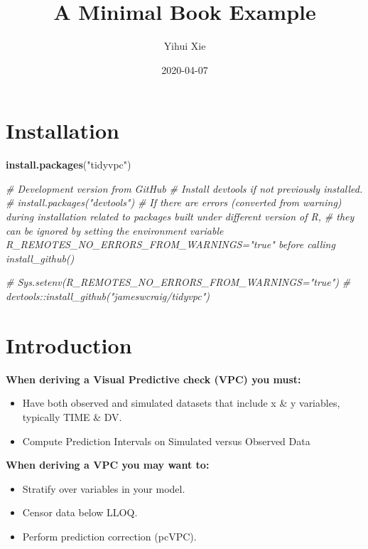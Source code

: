 \documentclass[
]{book}
\title{A Minimal Book Example}
\author{Yihui Xie}
\date{2020-04-07}
\newenvironment{Shaded}{\begin{snugshade}}{\end{snugshade}}
\newcommand{\CommentTok}[1]{\textcolor[rgb]{0.56,0.35,0.01}{\textit{#1}}}
\newcommand{\KeywordTok}[1]{\textcolor[rgb]{0.13,0.29,0.53}{\textbf{#1}}}
\newcommand{\NormalTok}[1]{#1}
\newcommand{\StringTok}[1]{\textcolor[rgb]{0.31,0.60,0.02}{#1}}
\begin{document}
\maketitle

{
\setcounter{tocdepth}{1}
\tableofcontents
}
\hypertarget{installation}{%
\chapter{Installation}\label{installation}}

\begin{Shaded}
\begin{Highlighting}[]
\KeywordTok{install.packages}\NormalTok{(}\StringTok{"tidyvpc"}\NormalTok{)}

\CommentTok{# Development version from GitHub}
\CommentTok{# Install devtools if not previously installed.}
\CommentTok{# install.packages("devtools")}
\CommentTok{# If there are errors (converted from warning) during installation related to packages built under different version of R,}
\CommentTok{# they can be ignored by setting the environment variable R_REMOTES_NO_ERRORS_FROM_WARNINGS="true" before calling install_github()}

\CommentTok{# Sys.setenv(R_REMOTES_NO_ERRORS_FROM_WARNINGS="true")}
\CommentTok{# devtools::install_github("jameswcraig/tidyvpc")}
\end{Highlighting}
\end{Shaded}

\hypertarget{intro}{%
\chapter{Introduction}\label{intro}}

\textbf{When deriving a Visual Predictive check (VPC) you must:}

\begin{itemize}
\item
  Have both observed and simulated datasets that include x \& y variables, typically TIME \& DV.
\item
  Compute Prediction Intervals on Simulated versus Observed Data
\end{itemize}

\textbf{When deriving a VPC you may want to:}

\begin{itemize}
\item
  Stratify over variables in your model.
\item
  Censor data below LLOQ.
\item
  Perform prediction correction (pcVPC).
\end{itemize}
\end{document}
